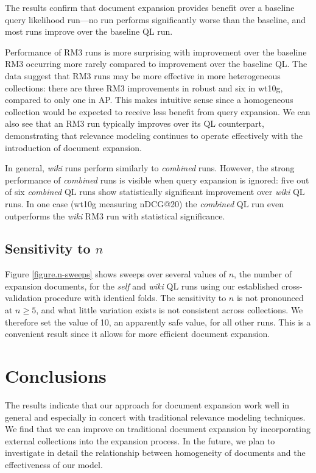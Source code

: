 \documentclass{sig-alternate}
\begin{document}
The results confirm that document expansion provides benefit over a baseline query likelihood run---no run performs significantly worse than the baseline, and most runs improve over the baseline QL run. %

Performance of RM3 runs is more surprising with improvement over the baseline RM3 occurring more rarely compared to improvement over the baseline QL. The data suggest that RM3 runs may be more effective in more heterogeneous collections: there are three RM3 improvements in robust and six in wt10g, compared to only one in AP. This makes intuitive sense since a homogeneous collection would be expected to receive less benefit from query expansion. We can also see that an RM3 run typically improves over its QL counterpart, demonstrating that relevance modeling continues to operate effectively with the introduction of document expansion.

In general, \textit{wiki} runs perform similarly to \textit{combined} runs. However, the strong performance of \textit{combined} runs is visible when query expansion is ignored: five out of six \textit{combined} QL runs show statistically significant improvement over \textit{wiki} QL runs. In one case (wt10g measuring nDCG@20) the \textit{combined} QL run even outperforms the \textit{wiki} RM3 run with statistical significance.

\subsection{Sensitivity to \boldmath$n$}\label{section.n-sensitivity}

Figure \ref{figure.n-sweeps} shows sweeps over several values of $n$, the number of expansion documents, for the \textit{self} and \textit{wiki} QL runs using our established cross-validation procedure with identical folds. The sensitivity to $n$ is not pronounced at $n \geq 5$, and what little variation exists is not consistent across collections. We therefore set the value of 10, an apparently safe value, for all other runs. This is a convenient result since it allows for more efficient document expansion.

\section{Conclusions}\label{section.conclusions}

The results indicate that our approach for document expansion work well in general and especially in concert with traditional relevance modeling techniques. We find that we can improve on traditional document expansion by incorporating external collections into the expansion process. In the future, we plan to investigate in detail the relationship between homogeneity of documents and the effectiveness of our model.
\end{document}
